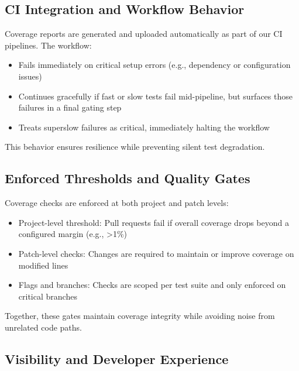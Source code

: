 \documentclass{article}
\begin{document}
\subsection{CI Integration and Workflow Behavior}
\label{ci-integration-and-workflow-behavior}

Coverage reports are generated and uploaded automatically as part of our CI pipelines.
The workflow:

\begin{itemize}

  \item Fails immediately on critical setup errors (e.g., dependency or
    configuration issues)

  \item Continues gracefully if fast or slow tests fail mid-pipeline, but
    surfaces those failures in a final gating step

  \item Treats superslow failures as critical, immediately halting the workflow
\end{itemize}

This behavior ensures resilience while preventing silent test degradation.

\subsection{Enforced Thresholds and Quality Gates}
\label{enforced-thresholds-and-quality-gates}

Coverage checks are enforced at both project and patch levels:

\begin{itemize}

  \item Project-level threshold: Pull requests fail if overall coverage drops
    beyond a configured margin (e.g., \textgreater1\%)

  \item Patch-level checks: Changes are required to maintain or improve coverage
    on modified lines

  \item Flags and branches: Checks are scoped per test suite and only enforced
    on critical branches
\end{itemize}

Together, these gates maintain coverage integrity while avoiding noise from
unrelated code paths.

\subsection{Visibility and Developer Experience}
\label{visibility-and-developer-experience}
\end{document}

